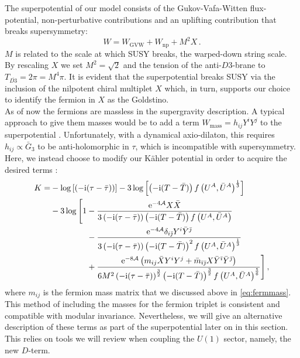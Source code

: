 \documentclass[12pt]{report}
\newcommand{\be}{\begin{equation}}
\newcommand{\ee}{\end{equation}}
\newcommand{\bea}{\begin{equation}\begin{aligned}}
\newcommand{\eea}{\end{aligned}\end{equation}}
\def\rmi{{\rm i}}
\def\rme{{\rm e}}
\def\ib{{\bar \imath}}
\def\jb{{\bar \jmath}}
\begin{document}
The superpotential of our model consists of the Gukov-Vafa-Witten flux-potential, non-perturbative contributions and an uplifting contribution that breaks supersymmetry:
\be 
W = W_{\text{GVW}} + W_{\text{np}} + M^2 X\,.
\label{eq:D3barsup}
\ee
$M$ is related to the scale at which SUSY breaks, the warped-down string scale. By rescaling $X$ we set $M^2 = \sqrt{2}$ and the tension of the anti-$D3$-brane to $T_{\overline{D3}} = 2 \pi = M^4 \pi$. It is evident that the superpotential breaks SUSY via the inclusion of the nilpotent chiral multiplet $X$ which, in turn, supports our choice to identify the fermion in $X$ as the Goldstino.\\
As of now the fermions are massless in the supergravity description. A typical approach to give them masses would be to add a term $W_{\text{mass}} = h_{ij}Y^i Y^j$ to the superpotential \cite{Vercnocke:2016fbt,GarciadelMoral:2017vnz}. Unfortunately, with a dynamical axio-dilaton, this requires $h_{ij}\propto \bar{G}_3$ to be anti-holomorphic in $\tau$, which is incompatible with supersymmetry. Here, we instead choose to modify our Kähler potential in order to acquire the desired terms :
\bea 
K = &- \log\left[\left(-\rmi(\tau-\bar{\tau})\right)\right] - 3 \log\left[\left(-\rmi(T-\bar{T})\right)f\left(U^A,\bar{U}^A\right)^{\frac{1}{3}}\right]\\
&- 3\log \Bigg[ 1- \frac{\rme^{-4\mathcal{A}} X\bar{X}}{3\left(-\rmi (\tau-\bar{\tau})\right)\left(-\rmi(T-\bar{T})\right)f\left(U^A,\bar{U}^A\right)}\\
&\qquad \qquad \;\,  - \frac{\rme^{-4\mathcal{A}}\delta_{i\jb}Y^i \bar{Y}^\jb}{3\left(-\rmi (\tau-\bar{\tau})\right)\left(-\rmi(T-\bar{T})\right)^2 f\left(U^A,\bar{U}^A\right)^{\frac{1}{3}}}\\
&\qquad \qquad \;\,  +\frac{\rme^{-8\mathcal{A}}\left( m_{ij} \bar{X} Y^i Y^j + \bar{m}_{\ib\jb}X \bar{Y}^\ib\bar{Y}^\jb\right)}{6 M^2 \left(-\rmi (\tau-\bar{\tau})\right)^\frac{3}{2} \left(-\rmi(T-\bar{T})\right)^{\frac{3}{2}} f\left(U^A,\bar{U}^A\right)^{\frac{5}{6}}}    \Bigg]\,,
\label{eq:Kferm}
\eea
where $m_{ij}$ is the fermion mass matrix that we discussed above in \eqref{eq:fermmass}. This method of including the masses for the fermion triplet is consistent and compatible with modular invariance. Nevertheless, we will give an alternative description of these terms as part of the superpotential later on in this section. This relies on tools we will review when coupling the $U(1)$ sector, namely, the new $D$-term.
\end{document}
